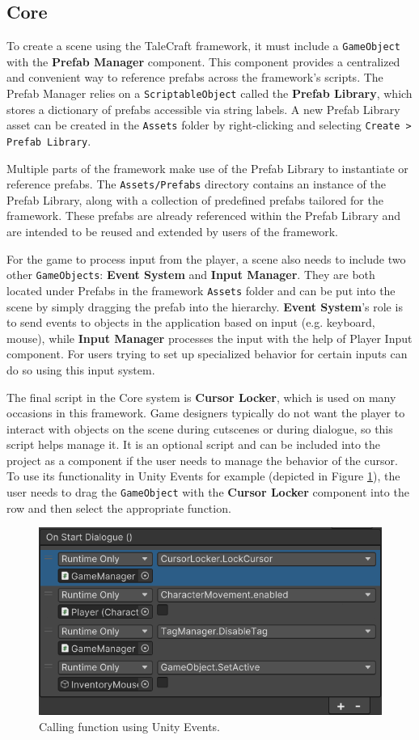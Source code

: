 \subsection{Core}
\label{Manual:Core}
To create a scene using the TaleCraft framework, it must include a \verb|GameObject| with the \textbf{Prefab Manager} component. This component provides a centralized and convenient way to reference prefabs across the framework's scripts. The Prefab Manager relies on a \verb|ScriptableObject| called the \textbf{Prefab Library}, which stores a dictionary of prefabs accessible via string labels. A new Prefab Library asset can be created in the \verb|Assets| folder by right-clicking and selecting \verb|Create > Prefab Library|.

Multiple parts of the framework make use of the Prefab Library to instantiate or reference prefabs. The \verb|Assets/Prefabs| directory contains an instance of the Prefab Library, along with a collection of predefined prefabs tailored for the framework. These prefabs are already referenced within the Prefab Library and are intended to be reused and extended by users of the framework.

For the game to process input from the player, a scene also needs to include two other \verb|GameObjects|: \textbf{Event System} and \textbf{Input Manager}. They are both located under Prefabs in the framework \verb|Assets| folder and can be put into the scene by simply dragging the prefab into the hierarchy. \textbf{Event System}'s role is to send events to objects in the application based on input (e.g. keyboard, mouse), while \textbf{Input Manager} processes the input with the help of Player Input component. For users trying to set up specialized behavior for certain inputs can do so using this input system.

The final script in the Core system is \textbf{Cursor Locker}, which is used on many occasions in this framework. Game designers typically do not want the player to interact with objects on the scene during cutscenes or during dialogue, so this script helps manage it. It is an optional script and can be included into the project as a component if the user needs to manage the behavior of the cursor. To use its functionality in Unity Events for example (depicted in Figure \ref{fig:Manual-UnityEvents}), the user needs to drag the \verb|GameObject| with the \textbf{Cursor Locker} component into the row and then select the appropriate function.


\begin{figure}[H]
\centering
\includegraphics[width=0.7\linewidth]{img/User doc/image_2025-07-07_133603895.png}
\caption{Calling function using Unity Events.}
\label{fig:Manual-UnityEvents}
\end{figure}


